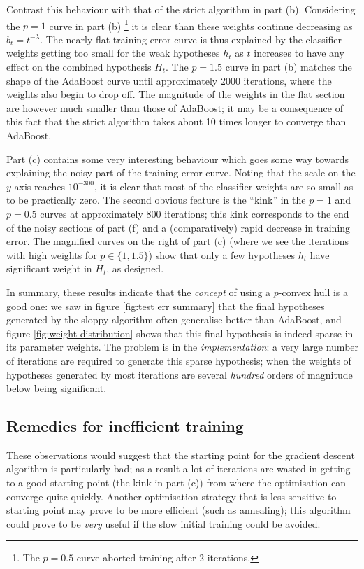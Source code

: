Contrast this behaviour with that of the strict algorithm in part (b).
Considering the $p=1$ curve in part (b)%
\footnote{The $p=0.5$ curve aborted training after 2 iterations.}
it is clear than these weights continue decreasing as $b_t =
t^{-\lambda}$.  The nearly flat training error curve is thus explained
by the classifier weights getting too small for the weak hypotheses
$h_t$ as $t$ increases to have any effect on the combined hypothesis
$H_t$.  The $p=1.5$ curve in part (b) matches the shape of the
AdaBoost curve until approximately 2000 iterations, where the weights
also begin to drop off.  The magnitude of the weights in the flat
section are however much smaller than those of AdaBoost; it may be a
consequence of this fact that the strict algorithm takes about 10
times longer to converge than AdaBoost. 

Part (c) contains some very interesting behaviour which goes some way
towards explaining the noisy part of the training error curve.  Noting
that the scale on the $y$ axis reaches $10^{-300}$, it is clear that
most of the classifier weights are so small as to be practically
zero.  The second obvious feature is the ``kink'' in the $p=1$ and
$p=0.5$ curves at approximately 800 iterations; this kink corresponds
to the end of the noisy sections of part (f) and a (comparatively)
rapid decrease in training error.  The magnified curves on the right
of part (c) (where we see the iterations with high weights for $p \in
\{1, 1.5\}$) show that only a few hypotheses $h_t$ have significant
weight in $H_t$, as designed.

In summary, these results indicate that the \emph{concept} of using a
$p$-convex hull is a good one: we saw in figure \ref{fig:test err
summary} that the final hypotheses generated by the sloppy algorithm
often generalise better than AdaBoost, and figure \ref{fig:weight
distribution} shows that this final hypothesis is indeed sparse in
its parameter weights.  The problem is in the \emph{implementation}:
a very large number of iterations are required to generate this sparse
hypothesis; when the weights of hypotheses generated by most
iterations are several \emph{hundred} orders of magnitude below being
significant.


\subsection{Remedies for inefficient training}

These observations would suggest that the starting point for the
gradient descent algorithm is particularly bad; as a result a lot of
iterations are wasted in getting to a good starting point (the kink in
part (c)) from where the optimisation can converge quite quickly.
Another optimisation strategy that is less sensitive to starting point
may prove to be more efficient (such as annealing); this algorithm
could prove to be \emph{very} useful if the slow initial training
could be avoided.

